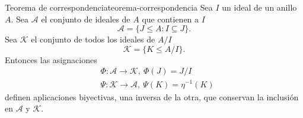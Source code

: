 \begin{theorem}{Teorema de correspondencia}{teorema-correspondencia}
    Sea \(I\) un ideal de un anillo \(A\). Sea $\mathcal{A}$ el conjunto de ideales de \(A\) que contienen a \(I\)
    \[
    \mathcal{A} = \{J \leq A : I \subseteq J\}.
    \]
    Sea $\mathcal{K}$ el conjunto de todos los ideales de \(A/I\)
    \[
    \mathcal{K} = \{ K \leq A/I \}.
    \]
    Entonces las asignaciones
    \begin{align*}
    &\Phi : \mathcal{A} \to \mathcal{K},\ \Phi(J) = J/I \\
    &\Psi : \mathcal{K} \to \mathcal{A},\ \Psi(K) = \eta^{-1}(K)
    \end{align*}
    definen aplicaciones biyectivas, una inversa de la otra, que conservan la inclusión en $\mathcal{A}$ y $\mathcal{K}$.
\end{theorem}

